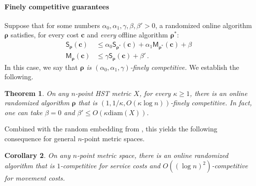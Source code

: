 \documentclass[11pt]{article}
\numberwithin{equation}{section}
\newtheorem{theorem}{Theorem}[section]
\newtheorem{corollary}[theorem]{Corollary}
\theoremstyle{definition}
\theoremstyle{plain}
\newcommand{\diam}{\mathrm{diam}}
\newcommand{\mcost}{\mathsf{M}}
\newcommand{\scost}{\mathsf{S}}
\begin{document}
\paragraph{Finely competitive guarantees}
Suppose that for some numbers $\alpha_0,\alpha_1,\gamma,\beta,\beta' > 0$,
a randomized online algorithm $\bm\rho$ satisfies, for every cost $\bm{c}$ and
\emph{every} offline algorithm $\bm{\rho}^*$:
\begin{align}
\scost_{\bm\rho}(\bm{c}) &\leq \alpha_0 \scost_{\bm\rho^*}(\bm{c}) + \alpha_1 \mcost_{\bm\rho^*}(\bm{c}) + \beta \label{eq:finesc}\\
\mcost_{\bm\rho}(\bm{c}) &\leq \gamma \scost_{\bm{\rho}}(\bm{c}) + \beta'\,.\label{eq:finemc}
\end{align}
In this case, we say that \emph{$\bm{\rho}$ is $(\alpha_0,\alpha_1,\gamma)$-finely competitive.}
We establish the following.

\begin{theorem}\label{thm:super}
	On any $n$-point HST metric $X$, for every $\kappa \geq 1$, there is an online randomized algorithm $\bm{\rho}$ that is
	$\left(1,1/\kappa,O(\kappa \log n)\right)$-finely competitive.
	In fact, one can take $\beta=0$ and $\beta' \leq O(\kappa \diam(X))$.
\end{theorem}

Combined with the random embedding from \cite{FRT04}, this yields the following consequence
for general $n$-point metric spaces.

\begin{corollary}
	On any $n$-point metric space, there is an online randomized algorithm that is
	$1$-competitive for service costs and $O((\log n)^2)$-competitive for movement costs.
\end{corollary}
\end{document}
